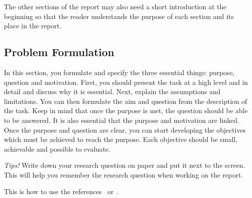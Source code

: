 The other sections of the report may also need a short introduction at the beginning so that the reader understands the purpose of each section and its place in the report.


\subsection{Problem Formulation} 

In this section, you formulate and specify the three essential things: purpose, question and motivation. First, you should present the task at a high level and in detail and discuss why it is essential. Next, explain the assumptions and limitations. You can then formulate the aim and question from the description of the task. Keep in mind that once the purpose is met, the question should be able to be answered. It is also essential that the purpose and motivation are linked. Once the purpose and question are clear, you can start developing the objectives which must be achieved to reach the purpose. Each objective should be small, achievable and possible to evaluate.  


\emph{Tips!} Write down your research question on paper and put it next to the screen. This will help you remember the research question when working on the report.

This is how to use the references~\cite{Berndtsson607210, Blomkvist2014} or~\cite{Turing1950}.